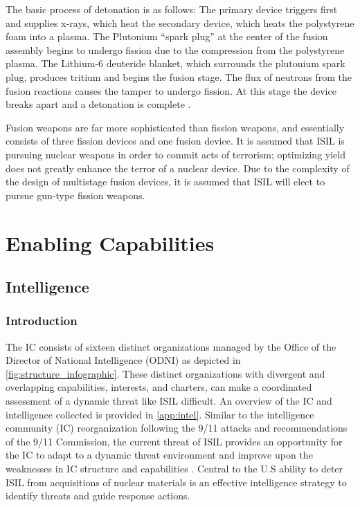 \documentclass{report}
\begin{document}
The basic process of detonation is as follows: The primary device triggers first and supplies x-rays, which heat the secondary device, which heats the polystyrene foam into a plasma. The Plutonium \enquote{spark plug} at the center of the fusion assembly begins to undergo fission due to the compression from the polystyrene plasma. The Lithium-6 deuteride blanket, which surrounds the plutonium spark plug, produces tritium and begins the fusion stage. The flux of neutrons from the fusion reactions causes the  tamper to undergo fission. At this stage the device breaks apart and a detonation is complete \cite{Defense1998}. 

Fusion weapons are far more sophisticated than fission weapons, and essentially consists of three fission devices and one fusion device. It is assumed that ISIL is pursuing nuclear weapons in order to commit acts of terrorism; optimizing yield does not greatly enhance the terror of a nuclear device. Due to the complexity of the design of multistage fusion devices, it is assumed that ISIL will elect to pursue gun-type fission weapons. 






\chapter{Enabling Capabilities }

\section{Intelligence }

\subsection{Introduction}

The IC consists of sixteen distinct organizations managed by the Office of the Director of National Intelligence (ODNI) as depicted in \autoref{fig:structure_infographic}. These distinct organizations with divergent and overlapping capabilities, interests, and charters, can make a coordinated assessment of a dynamic threat like ISIL difficult. An overview of the IC and intelligence collected is provided in \autoref{app:intel}. Similar to the intelligence community (IC) reorganization following the 9/11 attacks and recommendations of the 9/11 Commission, the current threat of ISIL provides an opportunity for the IC to adapt to a dynamic threat environment and improve upon the weaknesses in IC structure and capabilities \cite{Kean2004}. Central to the U.S ability to deter ISIL from acquisitions of nuclear materials is an effective intelligence strategy to identify threats and guide response actions. 
\end{document}
